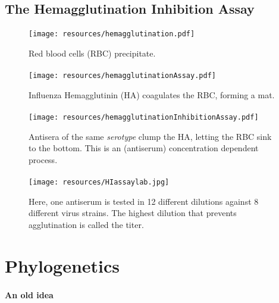 \documentclass{beamer}
\begin{document}
\begin{darkframes}
    \subsection{The Hemagglutination Inhibition Assay}
    \begin{frame}{\subsecname}
      \framesubtitle{}
      \begin{figure}
        \texttt{[image: resources/hemagglutination.pdf]}
        \caption{Red blood cells (RBC) precipitate.}
      \end{figure}
    \end{frame}

    \begin{frame}{\subsecname}
      \framesubtitle{}
      \begin{figure}
        \texttt{[image: resources/hemagglutinationAssay.pdf]}
        \caption{Influenza Hemagglutinin (HA) coagulates the RBC, forming a mat.}
      \end{figure}
    \end{frame}

    \begin{frame}{\subsecname}
      \framesubtitle{}
      \begin{figure}
        \texttt{[image: resources/hemagglutinationInhibitionAssay.pdf]}
        \caption{Antisera of the same \textit{serotype} clump the HA, letting the RBC sink to the bottom. This is an (antiserum) concentration dependent process.}
      \end{figure}
    \end{frame}

    \begin{frame}{\subsecname}
      \framesubtitle{}
      \begin{figure}
        \texttt{[image: resources/HIassaylab.jpg]}
        \caption{\footnotesize Here, one antiserum is tested in 12 different dilutions against 8 different virus strains. The highest dilution that prevents agglutination is called the titer.}
      \end{figure}
    \end{frame}



  \section{Phylogenetics}

    \begin{frame}{\secname}
      \framesubtitle{An old idea}
    \end{frame}


\end{darkframes}
\end{document}
